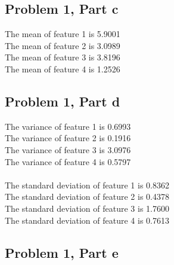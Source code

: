 \documentclass[11pt,psfig]{article}
\begin{document}
\newpage

\subsection*{Problem 1, Part c}

The mean of feature 1 is 5.9001\\
The mean of feature 2 is 3.0989\\
The mean of feature 3 is 3.8196\\
The mean of feature 4 is 1.2526\\

\subsection*{Problem 1, Part d}

The variance of feature 1 is 0.6993\\
The variance of feature 2 is 0.1916\\
The variance of feature 3 is 3.0976\\
The variance of feature 4 is 0.5797\\
\\
The standard deviation of feature 1 is 0.8362\\
The standard deviation of feature 2 is 0.4378\\
The standard deviation of feature 3 is 1.7600\\
The standard deviation of feature 4 is 0.7613\\

\subsection*{Problem 1, Part e}
\end{document}
